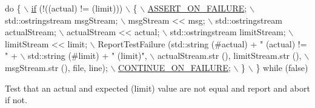 \begin{DoxyCode}
\textcolor{keywordflow}{do} \{                                                                  \hyperlink{loss__ITU1238_8m_a419d895abe1313c35fa353c93802647e}{\(\backslash\)}
\hyperlink{loss__ITU1238_8m_a419d895abe1313c35fa353c93802647e}{    if} (!((actual) != (limit)))                                         \(\backslash\)
      \{                                                                 \hyperlink{group__testing_ga044d7c8c214fe3761af96ee3cbe2edc3}{\(\backslash\)}
\hyperlink{group__testing_ga044d7c8c214fe3761af96ee3cbe2edc3}{        ASSERT\_ON\_FAILURE};                                              \(\backslash\)
        std::ostringstream msgStream;                                   \(\backslash\)
        msgStream << msg;                                               \(\backslash\)
        std::ostringstream actualStream;                                \(\backslash\)
        actualStream << actual;                                         \(\backslash\)
        std::ostringstream limitStream;                                 \(\backslash\)
        limitStream << limit;                                           \(\backslash\)
        ReportTestFailure (std::string (#actual) + \textcolor{stringliteral}{" (actual) != "} +    \(\backslash\)
                       std::string (#limit) + \textcolor{stringliteral}{" (limit)"},               \(\backslash\)
                       actualStream.str (), limitStream.str (),         \(\backslash\)
                       msgStream.str (), file, line);                   \hyperlink{group__testing_ga6f2bed856695445564c93cd367c69ea0}{\(\backslash\)}
\hyperlink{group__testing_ga6f2bed856695445564c93cd367c69ea0}{        CONTINUE\_ON\_FAILURE};                                            \(\backslash\)
      \}                                                                 \(\backslash\)
  \} \textcolor{keywordflow}{while} (\textcolor{keyword}{false})
\end{DoxyCode}


Test that an actual and expected (limit) value are not equal and report and abort if not. 


